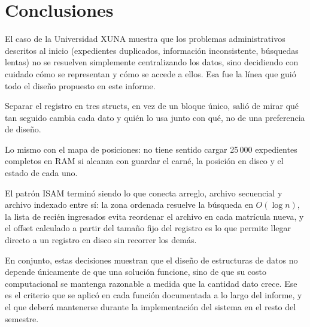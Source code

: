 \section{Conclusiones}

El caso de la Universidad XUNA muestra que los problemas administrativos descritos al inicio 
(expedientes duplicados, información inconsistente, búsquedas lentas) no se resuelven simplemente centralizando los datos,
sino decidiendo con cuidado cómo se representan y cómo se accede a ellos. Esa fue la línea que guió todo el diseño propuesto en este informe.

Separar el registro en tres structs, en vez de un bloque único, salió de mirar qué tan seguido cambia cada dato y quién lo usa junto con qué, no de una preferencia de diseño. 

Lo mismo con el mapa de posiciones: no tiene sentido cargar 25\,000 expedientes completos en RAM si alcanza con guardar el carné, la posición en disco y el estado de cada uno.

El patrón ISAM terminó siendo lo que conecta arreglo, archivo secuencial y archivo indexado entre sí: 
la zona ordenada resuelve la búsqueda en $O(\log n)$, 
la lista de recién ingresados evita reordenar el archivo en cada matrícula nueva, 
y el offset calculado a partir del tamaño fijo del registro es lo que permite llegar directo a un registro en disco sin recorrer los demás.

En conjunto, estas decisiones muestran que el diseño de estructuras de datos no depende únicamente de que una solución funcione, 
sino de que su costo computacional se mantenga razonable a medida que la cantidad dato crece. 
Ese es el criterio que se aplicó en cada función documentada a lo largo del informe, y el que deberá mantenerse durante la implementación del sistema en el resto del semestre.
